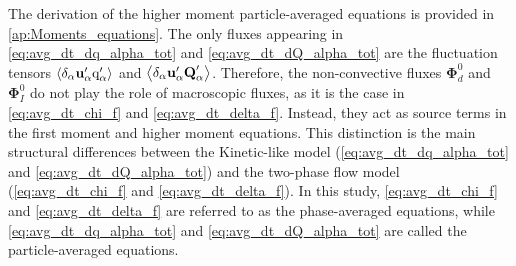 The derivation of the higher moment particle-averaged equations is provided in \ref{ap:Moments_equations}.
The only fluxes appearing in \ref{eq:avg_dt_dq_alpha_tot} and \ref{eq:avg_dt_dQ_alpha_tot} are the fluctuation tensors $\left<\delta_\alpha \textbf{u}_\alpha' \text q_\alpha'\right>$ and $\left<\delta_\alpha \textbf{u}_\alpha' \textbf{Q}_\alpha'\right>$. 
Therefore, the non-convective fluxes $\bm\Phi_d^0$ and $\bm\Phi_I^0$ do not play the role of macroscopic fluxes, as it is the case in \ref{eq:avg_dt_chi_f} and \ref{eq:avg_dt_delta_f}. Instead, they act as source terms in the first moment and higher moment equations. 
This distinction is the main structural differences between the Kinetic-like model (\ref{eq:avg_dt_dq_alpha_tot} and \ref{eq:avg_dt_dQ_alpha_tot}) and the two-phase flow model (\ref{eq:avg_dt_chi_f} and \ref{eq:avg_dt_delta_f}). 
In this study, \ref{eq:avg_dt_chi_f} and \ref{eq:avg_dt_delta_f} are referred to as the phase-averaged equations, while \ref{eq:avg_dt_dq_alpha_tot} and \ref{eq:avg_dt_dQ_alpha_tot} are called the particle-averaged equations. 

